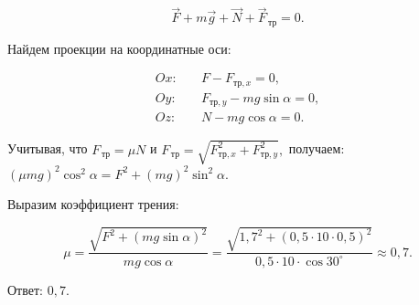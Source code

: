 \documentclass[12pt,a4paper]{article}
\begin{document}
{\[\overrightarrow{F} + m\vec g + \vec N + \vec F_{\,\text{тр}}=0.\]
 
Найдем проекции на координатные оси:

\[\begin{aligned} Ox:&\quad F-F_{\text{тр},x}=0,\\Oy:&\quad F_{\text{тр},y}-mg\sin\alpha=0,\\Oz:&\quad N-mg\cos\alpha=0.\end{aligned}\]

Учитывая, что $F_{\,\text{тр}}=\mu N$ и $F_{\,\text{тр}}= \sqrt{F_{\text{тр},x}^{2}+F_{\text{тр},y}^{2}} ,$ получаем: $( \mu m g ) ^2 \cos ^2 \alpha =F ^2 + ( mg ) ^2 \sin ^2 \alpha .$

Выразим коэффициент трения:

\[\mu= \frac{\sqrt{F ^2 + ( mg \sin \alpha ) ^2}}{mg \cos \alpha} = \frac{\sqrt{1{,}7 ^2 + ( 0{,}5 \cdot 10 \cdot 0{,}5 ) ^2}}{0{,}5 \cdot 10 \cdot \cos 30 ^\circ} \approx 0{,}7.\]

Ответ: $0{,}7$.
}
\end{document}
